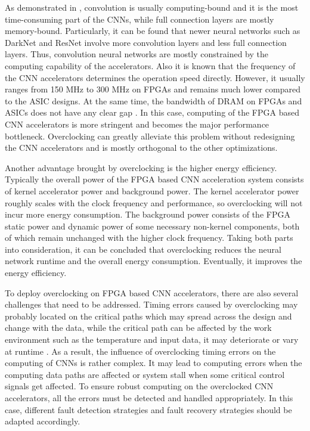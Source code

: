 As demonstrated in \cite{Caffeine_6} \cite{EIE_han_2016}, convolution is usually 
computing-bound and it is the most time-consuming part of the CNNs, while 
full connection layers are mostly memory-bound. Particularly, it can be found that 
newer neural networks such as DarkNet and ResNet involve more 
convolution layers and less full connection layers. Thus, convolution neural 
networks are mostly constrained by the computing capability of the accelerators. 
Also it is known that the frequency of the CNN 
accelerators determines the operation speed directly. However, 
it usually ranges from 150 MHz to 300 MHz on FPGAs and 
remains much lower compared to the ASIC designs. At the same time, the 
bandwidth of DRAM on FPGAs and ASICs does not have any 
clear gap \cite{asic_fpga}. In this case, computing of the FPGA based CNN 
accelerators is more stringent and becomes the major 
performance bottleneck. Overclocking can greatly alleviate this 
problem without redesigning the CNN accelerators and is 
mostly orthogonal to the other optimizations. 

Another advantage brought by overclocking is the higher 
energy efficiency. Typically the overall power of the 
FPGA based CNN acceleration system consists of kernel accelerator power 
and background power. The kernel accelerator power 
roughly scales with the clock frequency and performance, 
so overclocking will not incur more energy consumption. 
The background power consists of the 
FPGA static power and dynamic power of some necessary non-kernel 
components, both of which remain unchanged with the higher
clock frequency. Taking both parts into consideration, it can be 
concluded that overclocking reduces the neural 
network runtime and the overall energy consumption. 
Eventually, it improves the energy efficiency.

To deploy overclocking on FPGA based CNN accelerators, there are also several
challenges that need to be addressed. Timing errors caused by overclocking 
may probably located on the critical paths which may spread across the 
design and change with the data, while the critical path can be
affected by the work environment such as the temperature 
and input data, it may deteriorate or vary at runtime \cite{Paceline_15}. 
As a result, the influence of overclocking timing 
errors on the computing of CNNs is rather complex. It may lead to
computing errors when the computing data paths are affected or system stall 
when some critical control signals get affected. To ensure robust computing 
on the overclocked CNN accelerators, all the errors must be detected and 
handled appropriately. In this case, different fault detection strategies 
and fault recovery strategies should be adapted accordingly. 

